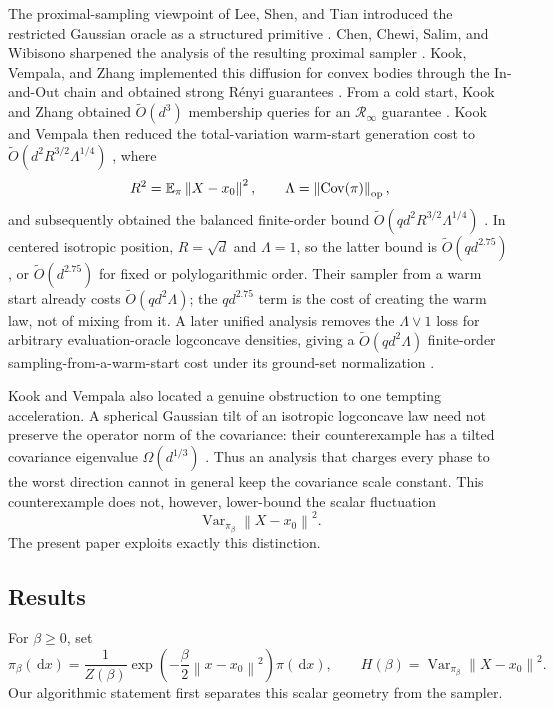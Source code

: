 \documentclass[11pt]{article}
\theoremstyle{remark}
\newcommand{\E}{\mathbb E}
\newcommand{\1}{\bm 1}
\newcommand{\Cov}{\operatorname{Cov}}
\newcommand{\Var}{\operatorname{Var}}
\newcommand{\dd}{\,\mathrm d}
\newcommand{\norm}[1]{\left\lVert #1\right\rVert}
\begin{document}
The proximal-sampling viewpoint of Lee, Shen, and Tian introduced the
restricted Gaussian oracle as a structured primitive
\citep{LST21structured}.  Chen, Chewi, Salim, and Wibisono sharpened the
analysis of the resulting proximal sampler \citep{CCSW22improved}.
Kook, Vempala, and Zhang implemented this diffusion for convex bodies
through the In-and-Out chain and obtained strong R\'enyi guarantees
\citep{KVZ24INO,KVZ26INO}.  From a cold start, Kook and Zhang obtained
$\widetilde O(d^3)$ membership queries for an
$\mathcal R_\infty$ guarantee \citep{KZ25Renyi}.  Kook and Vempala then
reduced the total-variation warm-start generation cost to
$\widetilde O(d^2R^{3/2}\Lambda^{1/4})$ \citep{KV25faster}, where
\[
  R^2=\E_\pi\norm{X-x_0}^2,
  \qquad \Lambda=\norm{\Cov(\pi)}_{\rm op},
\]
and subsequently obtained the balanced finite-order bound
$\widetilde O(qd^2R^{3/2}\Lambda^{1/4})$ \citep{KV26zeroth}.  In
centered isotropic position,
  $R=\sqrt d$ and $\Lambda=1$, so the latter bound is
  $\widetilde O(qd^{2.75})$, or $\widetilde O(d^{2.75})$ for fixed or
  polylogarithmic order.  Their sampler from a warm start already costs
  $\widetilde O(qd^2\Lambda)$; the $qd^{2.75}$ term is the cost of creating
the warm law, not of mixing from it.  A later unified analysis removes
the $\Lambda\vee1$ loss for arbitrary evaluation-oracle logconcave
densities, giving a $\widetilde O(qd^2\Lambda)$ finite-order
sampling-from-a-warm-start cost under its ground-set normalization
\citep{KV26unified}.

Kook and Vempala also located a genuine obstruction to one tempting
acceleration.  A spherical Gaussian tilt of an isotropic logconcave law
need not preserve the operator norm of the covariance: their
  counterexample has a tilted covariance eigenvalue $\Omega(d^{1/3})$
\citep[Proposition~6.3]{KV26zeroth}.  Thus an analysis that charges every
phase to the worst direction cannot in general keep the covariance
scale constant.  This counterexample does not, however, lower-bound
the scalar fluctuation
\[
  \Var_{\pi_\beta}\norm{X-x_0}^2.
\]
The present paper exploits exactly this distinction.

\subsection{Results}

For $\beta\geq0$, set
\begin{equation}\label{eq:path-intro}
  \pi_\beta(\dd x)
  =\frac{1}{Z(\beta)}
    \exp\!\left(-\frac\beta2\norm{x-x_0}^2\right)\pi(\dd x),
  \qquad
  H(\beta)=\Var_{\pi_\beta}\norm{X-x_0}^2.
\end{equation}
Our algorithmic statement first separates this scalar geometry from
the sampler.
\end{document}
